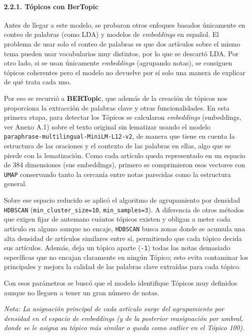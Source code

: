 \documentclass[
]{article}
\begin{document}
\paragraph{2.2.1. Tópicos con BerTopic}\label{tuxf3picos-con-bertopic}

Antes de llegar a este modelo, se probaron otros enfoques basados
únicamente en conteo de palabras (como LDA) y modelos de
\emph{embeddings} en español. El problema de usar solo el conteo de
palabras es que dos artículos sobre el mismo tema pueden usar
vocabularios muy distintos, por lo que se descartó LDA. Por otro lado,
si se usan únicamente \emph{embeddings} (agrupando notas), se consiguen
tópicos coherentes pero el modelo no devuelve por sí solo una manera de
explicar de qué trata cada uno.

Por eso se recurrió a \textbf{BERTopic}, que además de la creación de
tópicos nos proporciona la extracción de palabras clave y otras
funcionalidades. En esta primera etapa, para detectar los Tópicos se
calcularon \emph{embeddings} (embeddings, ver Anexo A.1) sobre el texto
original sin lematizar usando el modelo
\texttt{paraphrase-multilingual-MiniLM-L12-v2}, de manera que tiene en
cuenta la estructura de las oraciones y el contexto de las palabras en
ellas, algo que se pierde con la lematización. Como cada artículo queda
representado en un espacio de 384 dimensiones (sus embeddings), primero
se comprimieron esos vectores con \texttt{UMAP} conservando tanto la
cercanía entre notas parecidas como la estructura general.

Sobre ese espacio reducido se aplicó el algoritmo de agrupamiento por
densidad \texttt{HDBSCAN} (\texttt{min\_cluster\_size=10},
\texttt{min\_samples=3}). A diferencia de otros métodos que exigen fijar
de antemano cuántos tópicos existen y obligan a meter cada artículo en
alguno aunque no encaje, \texttt{HDBSCAN} busca zonas donde se acumula
una alta densidad de artículos similares entre sí, permitiendo que cada
tópico decida sus artículos. Además, deja un tópico aparte (\texttt{-1})
todas las notas demasiado específicas que no encajan claramente en
ningún Tópico; esto evita contaminar los principales y mejora la calidad
de las palabras clave extraídas para cada tópico.

Con esos parámetros se buscó que el modelo identifique Tópicos muy
definidos aunque no lleguen a tener un gran número de notas.

\emph{Nota: La asignación principal de cada artículo surge del agrupamiento por densidad 
en el espacio de embeddings (y de la posterior reasignación por umbral, donde 
se le asigna su tópico más similar o queda como outlier en el Tópico 100).}
\end{document}
